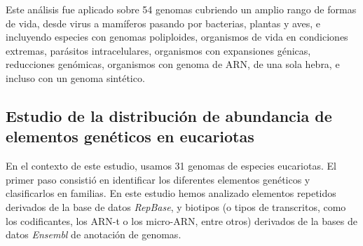 Este análisis fue aplicado sobre 54 genomas cubriendo un amplio rango de formas de vida, desde virus a mamíferos pasando por bacterias, plantas y aves, e incluyendo especies con genomas poliploides, organismos de vida en condiciones extremas, parásitos intracelulares, organismos con expansiones génicas, reducciones genómicas, organismos con genoma de ARN, de una sola hebra, e incluso con un genoma sintético.



\subsection*{Estudio de la distribución de abundancia de elementos genéticos en eucariotas}

En el contexto de este estudio, usamos 31 genomas de especies eucariotas. El primer paso consistió en identificar los diferentes elementos genéticos y clasificarlos en familias. En este estudio hemos analizado elementos repetidos derivados de la base de datos \textit{RepBase}, y biotipos (o tipos de transcritos, como los codificantes, los ARN-t o los micro-ARN, entre otros) derivados de la bases de datos \textit{Ensembl} de anotación de genomas.

